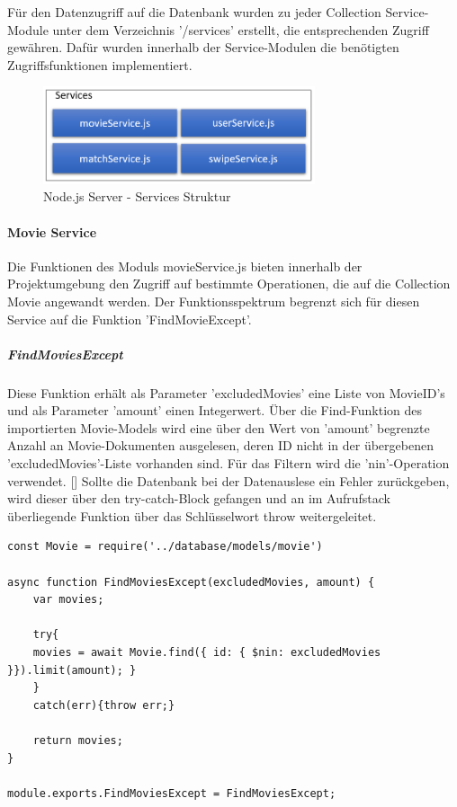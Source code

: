 Für den Datenzugriff auf die Datenbank wurden zu jeder Collection Service-Module unter dem Verzeichnis '/services' erstellt, die entsprechenden Zugriff gewähren. Dafür wurden innerhalb der Service-Modulen  die benötigten Zugriffsfunktionen implementiert.

\begin{figure}[h]
\centering
\includegraphics[width=8cm]{images/serviceStruktur.PNG}
\caption{Node.js Server - Services Struktur}
\end{figure}


%
%

\paragraph{Movie Service}
Die Funktionen des Moduls movieService.js bieten innerhalb der Projektumgebung den Zugriff auf bestimmte Operationen, die  auf die Collection Movie angewandt werden. Der Funktionsspektrum begrenzt sich für diesen Service auf die Funktion 'FindMovieExcept'.

\subparagraph{FindMoviesExcept}
Diese Funktion erhält als Parameter 'excludedMovies' eine Liste von MovieID's und als Parameter 'amount' einen Integerwert.
Über die Find-Funktion des importierten Movie-Models wird eine über den Wert von 'amount' begrenzte Anzahl an Movie-Dokumenten ausgelesen, deren ID nicht in der übergebenen 'excludedMovies'-Liste vorhanden sind. Für das Filtern wird die 'nin'-Operation verwendet. [] 
Sollte die Datenbank bei der Datenauslese ein Fehler zurückgeben, wird dieser über den try-catch-Block gefangen und an im Aufrufstack überliegende Funktion über das Schlüsselwort throw weitergeleitet.

\begin{lstlisting}[caption=movieService.js - FindMoviesExcept, label=lst:findmoviesexcept]
const Movie = require('../database/models/movie')

async function FindMoviesExcept(excludedMovies, amount) {
    var movies;

    try{ 
    movies = await Movie.find({ id: { $nin: excludedMovies }}).limit(amount); }
    }
    catch(err){throw err;}

    return movies;
}

module.exports.FindMoviesExcept = FindMoviesExcept;
\end{lstlisting}


